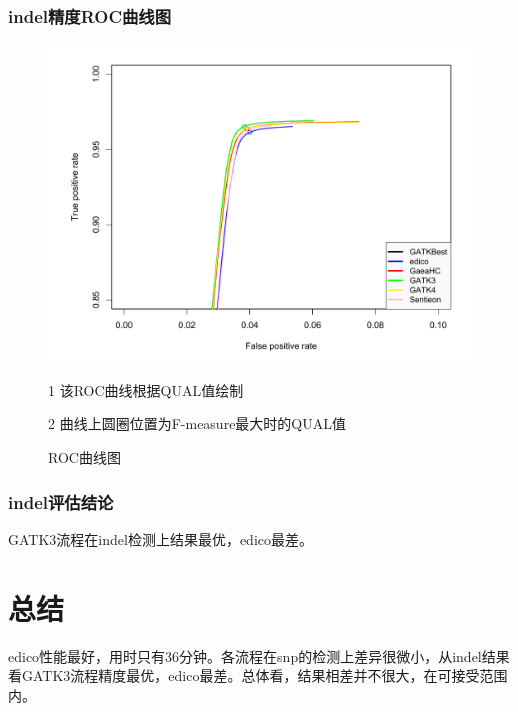 \documentclass[UTF8,10pt,a4paper]{ctexart}
\begin{document}
\subsubsection{indel精度ROC曲线图}
\begin{figure}[htb]
\begin{center}
\begin{threeparttable}
\label{indel}
\includegraphics[width=15cm]{indel.pdf}
\caption{ROC曲线图}
\begin{tablenotes}
\item[1] {\kaishu 该ROC曲线根据QUAL值绘制}
\item[2] {\kaishu 曲线上圆圈位置为F-measure最大时的QUAL值}
\end{tablenotes}
\end{threeparttable}
\end{center}
\end{figure}
\subsubsection{indel评估结论}
	GATK3流程在indel检测上结果最优，edico最差。


\section{总结}
edico性能最好，用时只有36分钟。各流程在snp的检测上差异很微小，从indel结果看GATK3流程精度最优，edico最差。总体看，结果相差并不很大，在可接受范围内。
\end{document}

